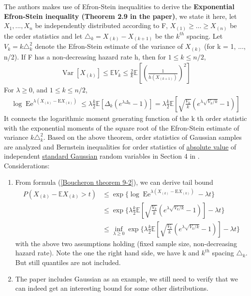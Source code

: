 \documentclass{article}
\begin{document}
The authors makes use of Efron-Stein inequalities to derive the \textbf{Exponential Efron-Stein inequality (Theorem 2.9 in the paper)}, we state it here, let $X_1,..., X_n$ be independently distributed according to F, $X_{(1)} \geq \ldots \geq X_{(n)}$ be the order statistics and let $\triangle_k = X_{(k)} - X_{(k+1)}$ be the $k^{th}$ spacing. Let $V_k = k \triangle_k^2$ denote the Efron-Stein estimate of the variance of $X_{(k)}$ (for k = 1, ..., n/2). If F has a non-decreasing hazard rate h, then for $1 \leq k \leq n/2$,
\begin{align}
    \operatorname{Var}\left[X_{(k)}\right] \leq \mathbb{E} V_{k} \leq \frac{2}{k} \mathbb{E}\left[\left(\frac{1}{h\left(X_{(k+1)}\right)}\right)^{2}\right]
\end{align}
For $\lambda \geq 0$, and $1\leq k \leq n/2$,
\begin{align}
    \label{Boucheron theorem 9-2}
    \log \operatorname{Ee}^{\lambda\left(X_{(k)}-\mathrm{E} X_{(k)}\right)} \leq \lambda \frac{k}{2} \mathbb{E}\left[\Delta_{k}\left(e^{\lambda \Delta_{k}}-1\right)\right]=\lambda \frac{k}{2} \mathbb{E}\left[\sqrt{\frac{V_{k}}{k}}\left(e^{\lambda \sqrt{V_{k} / k}}-1\right)\right]
\end{align}
It connects the logarithmic moment generating function of the k th order statistic with the exponential moments of the square root of the Efron-Stein estimate of variance $k \triangle_k^2$.
Based on the above theorem, order statistics of Gaussian samples are analyzed and Bernstein inequalities for order statistics of \underline{absolute value} of independent \underline{standard Gaussian} random variables in Section 4 in \cite{boucheron2012}. \\

Considerations:
\begin{enumerate}
    \item From formula (\ref{Boucheron theorem 9-2}), we can derive tail bound 
    \begin{align}
        P(X_{(k)} - \mathbb{E}X_{(k)} > t) &\leq \exp\{\log \operatorname{Ee}^{\lambda\left(X_{(k)}-\mathrm{E} X_{(k)}\right)} - \lambda t \}\\
        &\leq \exp \{\lambda \frac{k}{2} \mathbb{E}\left[\sqrt{\frac{V_{k}}{k}}\left(e^{\lambda \sqrt{V_{k} / k}}-1\right)\right] - \lambda t\}\\
        &\leq \inf_{\lambda \geq 0} \exp \{\lambda \frac{k}{2} \mathbb{E}\left[\sqrt{\frac{V_{k}}{k}}\left(e^{\lambda \sqrt{V_{k} / k}}-1\right)\right] - \lambda t\}
    \end{align}
    with the above two assumptions holding (fixed sample size, non-decreasing hazard rate). Note the one the right hand side, we have k and $k^{th}$ spacing $\triangle_k$. But still quantiles are not included.
    
    \item The paper includes Gaussian as an example, we still need to verify that we can indeed get an interesting bound for some other distributions. 
\end{enumerate}
\printbibliography
\end{document}
